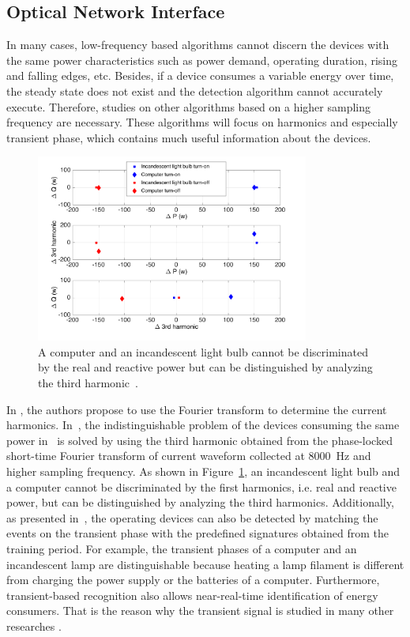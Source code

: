 \subsection{Optical Network Interface}\label{micro}

In many cases, low-frequency based algorithms cannot discern the devices with the same power characteristics such as power demand, operating duration, rising and falling edges, etc. Besides, if a device consumes a variable energy over time, the steady state does not exist and the detection algorithm cannot accurately execute. Therefore, studies on other algorithms based on a higher sampling frequency are necessary. These algorithms will focus on harmonics and especially transient phase, which contains much useful information about the devices.

\begin{figure}[!ht]
\centering
\includegraphics[width=0.8\textwidth]{./chapters/chapter2/images/third_harmonic_discrimination.pdf} 
\caption{A computer and an incandescent light bulb cannot be discriminated by the real and reactive power but can be distinguished by analyzing the third harmonic~\cite{Laughman03PEM}.} 
\label{fig:A14} 
\end{figure}
In \cite{Liang10I,Liang10II,Laughman03PEM,Cole2000,Suzuki08,Li12}, the authors propose to use the Fourier transform to determine the current harmonics. In~\cite{Laughman03PEM}, the indistinguishable problem of the devices consuming the same power in~\cite{Hart92} is solved by using the third harmonic obtained from the phase-locked short-time Fourier transform of current waveform collected at 8000~Hz and higher sampling frequency. As shown in Figure~\ref{fig:A14}, an incandescent light bulb and a computer cannot be discriminated by the first harmonics, i.e. real and reactive power, but can be distinguished by analyzing the third harmonics. Additionally, as presented in~\cite{Laughman03PEM}, the operating devices can also be detected by matching the events on the transient phase with the predefined signatures obtained from the training period. For example, the transient phases of a computer and an incandescent lamp are distinguishable because heating a lamp filament is different from charging the power supply or the batteries of a computer. Furthermore, transient-based recognition also allows near-real-time identification of energy consumers.
That is the reason why the transient signal is studied in many other researches \cite{Shaw08,Cox06,Yang07,Lin10,Chang11, Leeb95PD,Chang08,Lee05,Wichakool09,Chang12}.

